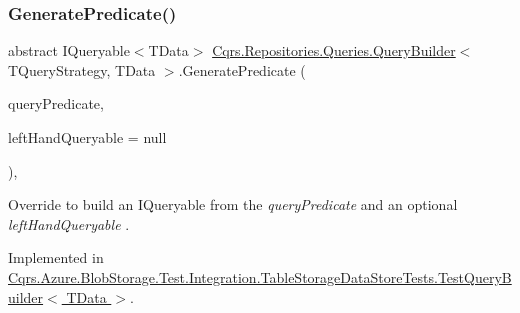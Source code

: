 \subsubsection{\texorpdfstring{Generate\+Predicate()}{GeneratePredicate()}\hspace{0.1cm}{\footnotesize\ttfamily [2/2]}}
{\footnotesize\ttfamily abstract I\+Queryable$<$T\+Data$>$ \hyperlink{classCqrs_1_1Repositories_1_1Queries_1_1QueryBuilder}{Cqrs.\+Repositories.\+Queries.\+Query\+Builder}$<$ T\+Query\+Strategy, T\+Data $>$.Generate\+Predicate (\begin{DoxyParamCaption}\item[{\hyperlink{classCqrs_1_1Repositories_1_1Queries_1_1QueryPredicate}{Query\+Predicate}}]{query\+Predicate,  }\item[{I\+Queryable$<$ T\+Data $>$}]{left\+Hand\+Queryable = {\ttfamily null} }\end{DoxyParamCaption})\hspace{0.3cm}{\ttfamily [protected]}, {}}



Override to build an I\+Queryable from the {\itshape query\+Predicate}  and an optional {\itshape left\+Hand\+Queryable} . 



Implemented in \hyperlink{classCqrs_1_1Azure_1_1BlobStorage_1_1Test_1_1Integration_1_1TableStorageDataStoreTests_1_1TestQueryBuilder_a4b65d9a13c425df0aa5bd309fc1824de_a4b65d9a13c425df0aa5bd309fc1824de}{Cqrs.\+Azure.\+Blob\+Storage.\+Test.\+Integration.\+Table\+Storage\+Data\+Store\+Tests.\+Test\+Query\+Builder$<$ T\+Data $>$}.

\mbox{\label{classCqrs_1_1Repositories_1_1Queries_1_1QueryBuilder_a6095cfcbd824578e7c70e2028e1ac6ad_a6095cfcbd824578e7c70e2028e1ac6ad}} 
